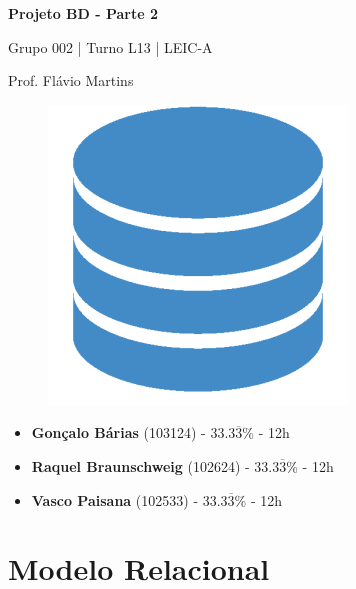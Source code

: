 \documentclass[12pt,a4paper]{article}
\begin{document}
  \begin{titlepage}
    \begin{center}
      \vspace*{5cm}
      \Huge
      \textbf{Projeto BD - Parte 2}

      \vspace{0.5cm}
      \LARGE
      Grupo 002 | Turno L13 | LEIC-A

      \vspace{0.5cm}
      \large
      Prof. Flávio Martins

      \vspace{0.5cm}
      \begin{figure}[h]
        \centering
        \includegraphics[scale=0.5]{report_logo.png}
      \end{figure}

      \vfill
      \large
      \begin{minipage}{0.8\textwidth}
        \begin{itemize}
          \item[] \textbf{Gonçalo Bárias} (103124) - 33.3$\overline{3}$\% - 12h
          \item[] \textbf{Raquel Braunschweig} (102624) - 33.3$\overline{3}$\% - 12h
          \item[] \textbf{Vasco Paisana} (102533) - 33.3$\overline{3}$\% - 12h
        \end{itemize}
      \end{minipage}
    \end{center}
  \end{titlepage}

  \section*{Modelo Relacional}
\end{document}
